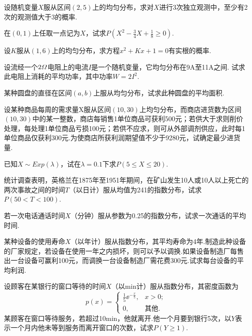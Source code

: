 \begin{xiti}
  \item 设随机变量$X$服从区间$(2,5)$上的均匀分布，求对$X$进行3次独立观测中，至少有2次的观测值大于3的概率.

  \item 在$(0,1)$上任取一点记为$X$，试求$P\left(X^2-\frac34X+\frac18\ge0\right)$.

  \item 设$K$服从$(1,6)$上的均匀分布，求方程$x^2+Kx+1=0$有实根的概率.

  \item 设流经一个$2\vOmega$电阻上的电流$I$是一个随机变量，它均匀分布在9A至11A之间. 试求此电阻上消耗的平均功率，其中功率$W=2I^2$.

  \item 某种圆盘的直径在区间$(a,b)$上服从均匀分布，试求此种圆盘的平均面积.

  \item 设某种商品每周的需求量X服从区间$(10,30)$上均匀分布，而商店进货数为区间$(10,30)$中的某一整数，商店每销售1单位商品可获利500元；若供大于求则削价处理，每处理1单位商品亏损100元；若供不应求，则可从外部调剂供应，此时每1单位商品仅获利300元.为使商店所获利润期望值不少于9280元，试确定最少进货量.

  \item 已知$X\sim Exp(\lambda)$，试在$\lambda=0.1$下求$P(5\le X\le20)$.

  \item 统计调查表明，英格兰在1875年至1951年期间，在矿山发生10人或10人以上死亡的两次事故之间的时间$T$（以日计）服从均值为241的指数分布，试求$P(50<T<100)$.

  \item 若一次电话通话时间$X$（分钟）服从参数为0.25的指数分布，试求一次通话的平均时间.

  \item 某种设备的使用寿命$X$（以年计）服从指数分布，其平均寿命为4年.制造此种设备的厂家规定，若设备在使用一年之内损坏，则可以予以调换.如果设备制造厂每售出一台设备可赢利100元，而调换一台设备制造厂需花费300元.试求每台设备的平均利润.

  \item 设顾客在某银行的窗口等待的时间$X$（以min计）服从指数分布，其密度函数为
      \[
        p(x) = \begin{cases}
          \frac15\ee^{-\frac x5}, & x>0; \\
          0, & \text{其他}.
        \end{cases}
      \]
      某顾客在窗口等待服务，若超过10min，他就离开.他一个月要到银行5次，以$Y$表示一个月内他未等到服务而离开窗口的次数，试求$P(Y\ge1)$.


\end{xiti}
